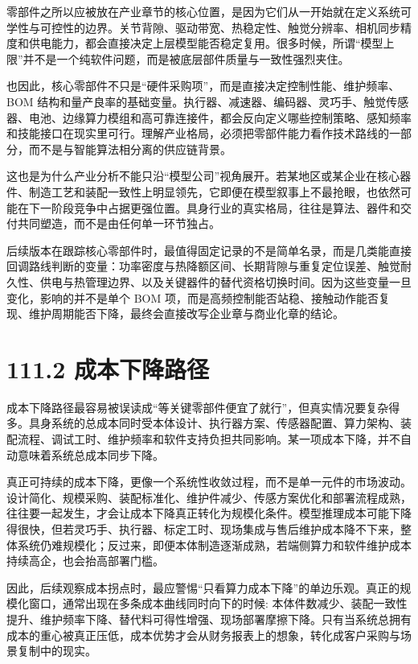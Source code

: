 零部件之所以应被放在产业章节的核心位置，是因为它们从一开始就在定义系统可学性与可控性的边界。关节背隙、驱动带宽、热稳定性、触觉分辨率、相机同步精度和供电能力，都会直接决定上层模型能否稳定复用。很多时候，所谓“模型上限”并不是一个纯软件问题，而是被底层部件质量与一致性强烈夹住。

也因此，核心零部件不只是“硬件采购项”，而是直接决定控制性能、维护频率、BOM 结构和量产良率的基础变量。执行器、减速器、编码器、灵巧手、触觉传感器、电池、边缘算力模组和高可靠连接件，都会反向定义哪些控制策略、感知频率和技能接口在现实里可行。理解产业格局，必须把零部件能力看作技术路线的一部分，而不是与智能算法相分离的供应链背景。

这也是为什么产业分析不能只沿“模型公司”视角展开。若某地区或某企业在核心器件、制造工艺和装配一致性上明显领先，它即便在模型叙事上不最抢眼，也依然可能在下一阶段竞争中占据更强位置。具身行业的真实格局，往往是算法、器件和交付共同塑造，而不是由任何单一环节独占。

后续版本在跟踪核心零部件时，最值得固定记录的不是简单名录，而是几类能直接回调路线判断的变量：功率密度与热降额区间、长期背隙与重复定位误差、触觉耐久性、供电与热管理边界、以及关键器件的替代资格切换时间。因为这些变量一旦变化，影响的并不是单个 BOM 项，而是高频控制能否站稳、接触动作能否复现、维护周期能否下降，最终会直接改写企业章与商业化章的结论。

\section*{111.2 成本下降路径}


成本下降路径最容易被误读成“等关键零部件便宜了就行”，但真实情况要复杂得多。具身系统的总成本同时受本体设计、执行器方案、传感器配置、算力架构、装配流程、调试工时、维护频率和软件支持负担共同影响。某一项成本下降，并不自动意味着系统总成本同步下降。

真正可持续的成本下降，更像一个系统性收敛过程，而不是单一元件的市场波动。设计简化、规模采购、装配标准化、维护件减少、传感方案优化和部署流程成熟，往往要一起发生，才会让成本下降真正转化为规模化条件。模型推理成本可能下降得很快，但若灵巧手、执行器、标定工时、现场集成与售后维护成本降不下来，整体系统仍难规模化；反过来，即便本体制造逐渐成熟，若端侧算力和软件维护成本持续高企，也会抬高部署门槛。

因此，后续观察成本拐点时，最应警惕“只看算力成本下降”的单边乐观。真正的规模化窗口，通常出现在多条成本曲线同时向下的时候: 本体件数减少、装配一致性提升、维护频率下降、替代料可得性增强、现场部署摩擦下降。只有当系统总拥有成本的重心被真正压低，成本优势才会从财务报表上的想象，转化成客户采购与场景复制中的现实。

